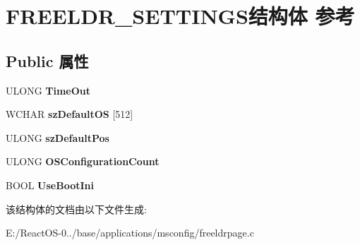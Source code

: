 \hypertarget{struct_f_r_e_e_l_d_r___s_e_t_t_i_n_g_s}{}\section{F\+R\+E\+E\+L\+D\+R\+\_\+\+S\+E\+T\+T\+I\+N\+G\+S结构体 参考}
\label{struct_f_r_e_e_l_d_r___s_e_t_t_i_n_g_s}
\subsection*{Public 属性}
\begin{DoxyCompactItemize}
\item 
\mbox{\label{struct_f_r_e_e_l_d_r___s_e_t_t_i_n_g_s_aba97d6a15c71a2ba62f648665ca56e70}} 
U\+L\+O\+NG {\bfseries Time\+Out}
\item 
\mbox{\label{struct_f_r_e_e_l_d_r___s_e_t_t_i_n_g_s_a18fab94a14fe7a7f58c9a1eaf059ccaf}} 
W\+C\+H\+AR {\bfseries sz\+Default\+OS} \mbox{[}512\mbox{]}
\item 
\mbox{\label{struct_f_r_e_e_l_d_r___s_e_t_t_i_n_g_s_a697a3999fcc88523792b68f425a9cc28}} 
U\+L\+O\+NG {\bfseries sz\+Default\+Pos}
\item 
\mbox{\label{struct_f_r_e_e_l_d_r___s_e_t_t_i_n_g_s_a7a02c848a4372972f81c19d3fc5dbd30}} 
U\+L\+O\+NG {\bfseries O\+S\+Configuration\+Count}
\item 
\mbox{\label{struct_f_r_e_e_l_d_r___s_e_t_t_i_n_g_s_a7bdedc09e59eeccbb695f74fd95819de}} 
B\+O\+OL {\bfseries Use\+Boot\+Ini}
\end{DoxyCompactItemize}


该结构体的文档由以下文件生成\+:\begin{DoxyCompactItemize}
\item 
E\+:/\+React\+O\+S-\/0../base/applications/msconfig/freeldrpage.\+c\end{DoxyCompactItemize}
